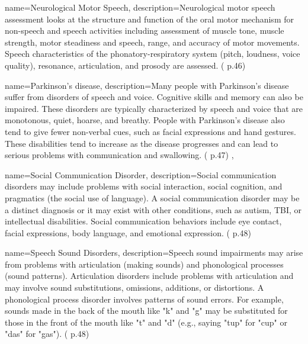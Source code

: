 
 {
	name={Neurological Motor Speech}, 
	description={Neurological motor speech assessment looks at the structure and function of the oral motor mechanism for non-speech and speech activities including assessment of muscle tone, muscle strength, motor steadiness and speech, range, and accuracy of motor movements. Speech characteristics of the phonatory-respiratory system (pitch, loudness, voice quality), resonance, articulation, and prosody are assessed. (\cite{SLPathologies} p.46)
}
}

 {
	name={Parkinson’s disease},
	description={Many people with Parkinson's disease suffer from disorders of speech and voice. Cognitive skills and memory can also be impaired. These disorders are typically characterized by speech and voice that are monotonous, quiet, hoarse, and breathy. People with Parkinson's disease also tend to give fewer non-verbal cues, such as facial expressions and hand gestures. These disabilities tend to increase as the disease progresses and can lead to serious problems with communication and swallowing. (\cite{SLPathologies} p.47)
},
}


 {
	name={Social Communication Disorder}, 
	description={Social communication disorders may include problems with social interaction, social cognition, and pragmatics (the social use of language). A social communication disorder may be a distinct diagnosis or it may exist with other conditions, such as autism, TBI, or intellectual disabilities. Social communication behaviors include eye contact, facial expressions, body language, and emotional expression. (\cite{SLPathologies} p.48)
}
}


 {
	name={Speech Sound Disorders}, 
	description={Speech sound impairments may arise from problems with articulation (making sounds) and phonological processes (sound patterns). Articulation disorders include problems with articulation and may involve sound substitutions, omissions, additions, or distortions. A phonological process disorder involves patterns of sound errors. For example, sounds made in the back of the mouth like "k" and "g" may be substituted for those in the front of the mouth like "t" and "d" (e.g., saying "tup" for "cup" or "das" for "gas"). (\cite{SLPathologies} p.48)
}
}


